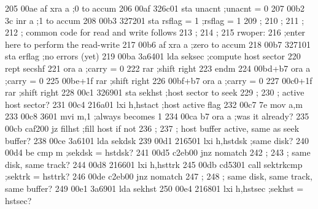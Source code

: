 205    00ae af               xra      a                      ;0 to accum
206    00af 326c01           sta      unacnt                 ;unacnt = 0
207    00b2 3c               inr      a                      ;1 to accum
208    00b3 327201           sta      rsflag = 1             ;rsflag = 1
209                ;
210                ;
211                ;
212                ;         common code for read and write follows
213                ;
214                ;
215                rwoper:
216                          ;enter here to perform the read-write
217    00b6 af               xra      a                      ;zero to accum
218    00b7 327101           sta      erflag                 ;no errors (yet)
219    00ba 3a6401           lda      seksec                 ;compute host sector
220                          rept     secshf
221                          ora      a                      ;carry = 0
222                          rar                             ;shift right
223                          endm
224    00bd+b7               ora      a                      ;carry = 0
225    00be+1f               rar                             ;shift right
226    00bf+b7               ora      a                      ;carry = 0
227    00c0+1f               rar                             ;shift right
228    00c1 326901           sta      sekhst                 ;host sector to seek
229                ;
230                ;         active host sector?
231    00c4 216a01           lxi      h,hstact               ;host active flag
232    00c7 7e               mov      a,m
233    00c8 3601             mvi      m,1                    ;always becomes 1
234    00ca b7               ora      a                      ;was it already?
235    00cb caf200           jz       filhst                 ;fill host if not
236                ;
237                ;         host buffer active, same as seek buffer?
238    00ce 3a6101           lda      sekdsk
239    00d1 216501           lxi      h,hstdsk               ;same disk?
240    00d4 be               cmp      m                      ;sekdsk = hstdsk?
241    00d5 c2eb00           jnz      nomatch
242                ;
243                ;         same disk, same track?
244    00d8 216601           lxi      h,hsttrk
245    00db cd5301           call     sektrkcmp              ;sektrk = hsttrk?
246    00de c2eb00           jnz      nomatch
247                ;
248                ;         same disk, same track, same buffer?
249    00e1 3a6901           lda      sekhst
250    00e4 216801           lxi      h,hstsec               ;sekhst = hstsec?
